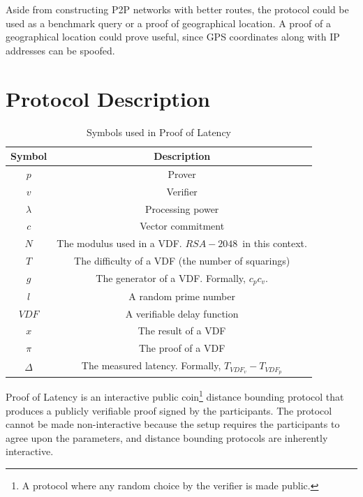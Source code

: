 Aside from constructing P2P networks with better routes, the protocol could be used as a benchmark query or a proof of geographical location. A proof of a geographical location could prove useful, since GPS coordinates along with IP addresses can be spoofed.

\section{Protocol Description}
\begin{table}[h!]
	\centering
	\begin{tabular}{ c|c  }
		Symbol        & Description                                             \\
		\hline
		\( p \)       & Prover                                                  \\
		\( v \)       & Verifier                                                \\
		\( \lambda \) & Processing power                                        \\
		\( c \)       & Vector commitment                                       \\
		\( N \)       & The modulus used in a VDF. \(RSA-2048\)~in this context.   \\

		\( T \)       & The difficulty of a VDF (the number of squarings)       \\
		\( g \)       & The generator of a VDF. Formally, \(c_p c_v\).          \\
		\( l \)       & A random prime number                                   \\
		\( VDF \)     & A verifiable delay function                             \\
		\( x \)       & The result of a VDF                                     \\
		\(\pi \)      & The proof of a VDF                                      \\
		\(\Delta\)    & The measured latency. Formally, \(T_{VDF_v} - T_{VDF_p}\) \\
	\end{tabular}
	\caption{Symbols used in Proof of Latency}
	\label{table:1}
\end{table}

Proof of Latency is an interactive public coin\footnote{A protocol where any random choice by the verifier is made public.} distance bounding protocol that produces a publicly verifiable proof signed by the participants. The protocol cannot be made non-interactive because the setup requires the participants to agree upon the parameters, and distance bounding protocols are inherently interactive.

